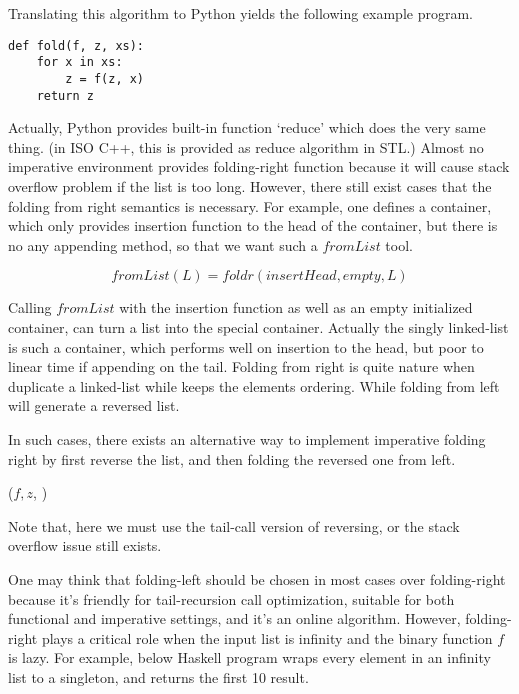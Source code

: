 \documentclass[b5paper]{article}
\begin{document}
Translating this algorithm to Python yields the following example program.

\lstset{language=Python}
\begin{lstlisting}
def fold(f, z, xs):
    for x in xs:
        z = f(z, x)
    return z
\end{lstlisting}

Actually, Python provides built-in function `reduce' which does the very same thing. (in ISO C++, this is
provided as reduce algorithm in STL.) Almost no imperative environment provides folding-right function because
it will cause stack overflow problem if the list is too long. However, there still exist cases that the folding from right
semantics is necessary. For example, one defines a container, which only provides insertion function to
the head of the container, but there is no any appending method, so that we want such a $fromList$
tool.

\[
fromList(L) = foldr(insertHead, empty, L)
\]

Calling $fromList$ with the insertion function as well as an empty initialized container, can turn a list
into the special container. Actually the singly linked-list is such a container, which performs well
on insertion to the head, but poor to linear time if appending on the tail. Folding from right is quite
nature when duplicate a linked-list while keeps the elements ordering. While folding from left will generate
a reversed list.

In such cases, there exists an alternative way to implement imperative folding right by first reverse the list, and then
folding the reversed one from left.

\begin{algorithmic}[1]
  \State \Return {}($f, z$, )
\EndFunction
\end{algorithmic}

Note that, here we must use the tail-call version of reversing, or the stack overflow issue still exists.

One may think that folding-left should be chosen in most cases over folding-right because it's friendly for
tail-recursion call optimization, suitable for both functional and imperative settings, and it's an online
algorithm. However, folding-right plays a critical role when the input list is infinity and the binary function
$f$ is lazy. For example, below Haskell program wraps every element in an infinity list to a singleton, and
returns the first 10 result.
\end{document}
